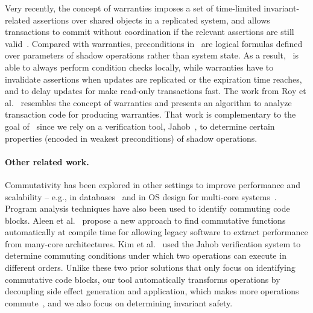 Very recently, the concept of warranties imposes a set of time-limited invariant-related assertions
over shared objects in a replicated system, and allows transactions
to commit without coordination if the relevant assertions
are still valid~\cite{Liu2014Warranties}. Compared with warranties, preconditions in \tool\ 
are logical formulas defined over parameters of shadow operations rather than system state. As a result,
\tool\ is able to always perform condition checks locally, while warranties have to 
invalidate assertions when updates are replicated or the expiration time reaches, and to delay updates 
for make read-only transactions fast. 
The work from Roy et al.~\cite{Roy2014Adaptive} resembles the concept of warranties and presents an
 algorithm to analyze transaction code for producing warranties. That work is complementary to the goal of \tool\ 
since we rely on a verification tool, Jahob~\cite{Kuncak2007Jahob}, to determine certain properties (encoded in
weakest preconditions) of shadow operations.

\noindent\paragraph{Other related work.} 
Commutativity has been explored in other settings to improve
performance and scalability -- e.g., in databases~\cite{Weihl1988Commutativity}
and in OS design for multi-core 
systems~\cite{Clements2013Scalable}.
Program analysis techniques have also been used to 
identify commuting code blocks. Aleen et
al.~\cite{Aleen2009CommuteAnalysis} propose a new approach to find
commutative functions automatically at compile time for allowing
legacy software to extract performance from many-core
architectures. Kim et al.~\cite{Kim2011CommuteVerification} used the
Jahob verification system to determine commuting conditions under
which two operations can execute in different orders. 
Unlike these two prior solutions that only focus on identifying commutative
code blocks, our tool automatically transforms operations
by decoupling side effect generation and application, which makes more 
operations commute~\cite{Li2012RedBlue}, and we also focus on determining
invariant safety.


